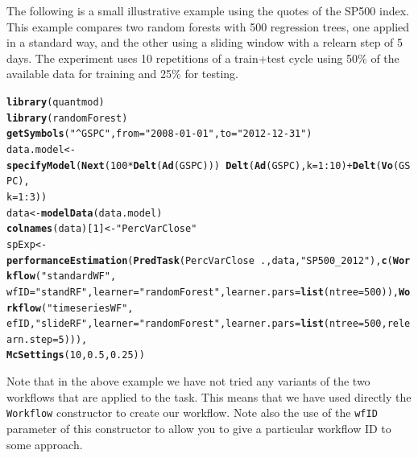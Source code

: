 \documentclass[10pt,a4paper]{article}\usepackage[]{graphicx}\usepackage[]{color}
\makeatletter
\newcommand{\hlnum}[1]{\textcolor[rgb]{0.686,0.059,0.569}{#1}}%
\newcommand{\hlstr}[1]{\textcolor[rgb]{0.192,0.494,0.8}{#1}}%
\newcommand{\hlopt}[1]{\textcolor[rgb]{0,0,0}{#1}}%
\newcommand{\hlstd}[1]{\textcolor[rgb]{0.345,0.345,0.345}{#1}}%
\newcommand{\hlkwb}[1]{\textcolor[rgb]{0.69,0.353,0.396}{#1}}%
\newcommand{\hlkwc}[1]{\textcolor[rgb]{0.333,0.667,0.333}{#1}}%
\newcommand{\hlkwd}[1]{\textcolor[rgb]{0.737,0.353,0.396}{\textbf{#1}}}%
\newenvironment{kframe}{%
 \def\at@end@of@kframe{}%
 \ifinner\ifhmode%
  \def\at@end@of@kframe{\end{minipage}}%
  \begin{minipage}{\columnwidth}%
 \fi\fi%
 \def\FrameCommand##1{\hskip\@totalleftmargin \hskip-\fboxsep
 \colorbox{shadecolor}{##1}\hskip-\fboxsep
     \hskip-\linewidth \hskip-\@totalleftmargin \hskip\columnwidth}%
 \MakeFramed {\advance\hsize-\width
   \@totalleftmargin\z@ \linewidth\hsize
   \@setminipage}}%
 {\par\unskip\endMakeFramed%
 \at@end@of@kframe}
\newenvironment{knitrout}{}{} %
\makeatother
\begin{document}
The following is a small illustrative example using the quotes of the
SP500 index. This example compares two random forests with 500
regression trees, one applied in a standard way, and the other using
a sliding window with a relearn step of 5 days. The experiment
uses 10 repetitions of a train+test cycle using 50\% of the available
data for training and 25\% for testing.

\begin{knitrout}
\color{fgcolor}\begin{kframe}
\begin{alltt}
\hlkwd{library}\hlstd{(quantmod)}
\hlkwd{library}\hlstd{(randomForest)}
\hlkwd{getSymbols}\hlstd{(}\hlstr{"^GSPC"}\hlstd{,} \hlkwc{from} \hlstd{=} \hlstr{"2008-01-01"}\hlstd{,} \hlkwc{to} \hlstd{=} \hlstr{"2012-12-31"}\hlstd{)}
\hlstd{data.model} \hlkwb{<-} \hlkwd{specifyModel}\hlstd{(}\hlkwd{Next}\hlstd{(}\hlnum{100} \hlopt{*} \hlkwd{Delt}\hlstd{(}\hlkwd{Ad}\hlstd{(GSPC)))} \hlopt{~} \hlkwd{Delt}\hlstd{(}\hlkwd{Ad}\hlstd{(GSPC),} \hlkwc{k} \hlstd{=} \hlnum{1}\hlopt{:}\hlnum{10}\hlstd{)} \hlopt{+} \hlkwd{Delt}\hlstd{(}\hlkwd{Vo}\hlstd{(GSPC),}
    \hlkwc{k} \hlstd{=} \hlnum{1}\hlopt{:}\hlnum{3}\hlstd{))}
\hlstd{data} \hlkwb{<-} \hlkwd{modelData}\hlstd{(data.model)}
\hlkwd{colnames}\hlstd{(data)[}\hlnum{1}\hlstd{]} \hlkwb{<-} \hlstr{"PercVarClose"}
\hlstd{spExp} \hlkwb{<-} \hlkwd{performanceEstimation}\hlstd{(}\hlkwd{PredTask}\hlstd{(PercVarClose} \hlopt{~} \hlstd{., data,} \hlstr{"SP500_2012"}\hlstd{),} \hlkwd{c}\hlstd{(}\hlkwd{Workflow}\hlstd{(}\hlstr{"standardWF"}\hlstd{,}
    \hlkwc{wfID} \hlstd{=} \hlstr{"standRF"}\hlstd{,} \hlkwc{learner} \hlstd{=} \hlstr{"randomForest"}\hlstd{,} \hlkwc{learner.pars} \hlstd{=} \hlkwd{list}\hlstd{(}\hlkwc{ntree} \hlstd{=} \hlnum{500}\hlstd{)),} \hlkwd{Workflow}\hlstd{(}\hlstr{"timeseriesWF"}\hlstd{,}
    \hlstd{efID,} \hlstr{"slideRF"}\hlstd{,} \hlkwc{learner} \hlstd{=} \hlstr{"randomForest"}\hlstd{,} \hlkwc{learner.pars} \hlstd{=} \hlkwd{list}\hlstd{(}\hlkwc{ntree} \hlstd{=} \hlnum{500}\hlstd{,} \hlkwc{relearn.step} \hlstd{=} \hlnum{5}\hlstd{))),}
    \hlkwd{McSettings}\hlstd{(}\hlnum{10}\hlstd{,} \hlnum{0.5}\hlstd{,} \hlnum{0.25}\hlstd{))}
\end{alltt}
\end{kframe}
\end{knitrout}


Note that in the above example we have not tried any variants of the two workflows that are applied to the task. This means that we have used directly the \texttt{Workflow} constructor to create our workflow. Note also the use of the \texttt{wfID} parameter of this constructor to allow you to give a particular workflow ID to some approach.
\end{document}
